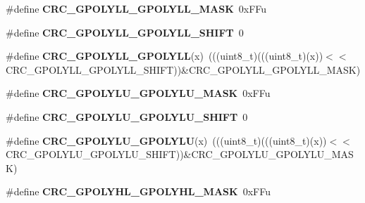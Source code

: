 \begin{DoxyCompactItemize}
\item 
\#define {\bfseries C\+R\+C\+\_\+\+G\+P\+O\+L\+Y\+L\+L\+\_\+\+G\+P\+O\+L\+Y\+L\+L\+\_\+\+M\+A\+SK}~0x\+F\+Fu\hypertarget{group__CRC__Register__Masks_ga659c987f1e9d74e32d16e4b69bd763ee}{}\label{group__CRC__Register__Masks_ga659c987f1e9d74e32d16e4b69bd763ee}

\item 
\#define {\bfseries C\+R\+C\+\_\+\+G\+P\+O\+L\+Y\+L\+L\+\_\+\+G\+P\+O\+L\+Y\+L\+L\+\_\+\+S\+H\+I\+FT}~0\hypertarget{group__CRC__Register__Masks_ga1a323693acd9a37bb90abdc7f16ebbd8}{}\label{group__CRC__Register__Masks_ga1a323693acd9a37bb90abdc7f16ebbd8}

\item 
\#define {\bfseries C\+R\+C\+\_\+\+G\+P\+O\+L\+Y\+L\+L\+\_\+\+G\+P\+O\+L\+Y\+LL}(x)~(((uint8\+\_\+t)(((uint8\+\_\+t)(x))$<$$<$C\+R\+C\+\_\+\+G\+P\+O\+L\+Y\+L\+L\+\_\+\+G\+P\+O\+L\+Y\+L\+L\+\_\+\+S\+H\+I\+FT))\&C\+R\+C\+\_\+\+G\+P\+O\+L\+Y\+L\+L\+\_\+\+G\+P\+O\+L\+Y\+L\+L\+\_\+\+M\+A\+SK)\hypertarget{group__CRC__Register__Masks_gafd454535299300522b0dfe8b5c46b4c4}{}\label{group__CRC__Register__Masks_gafd454535299300522b0dfe8b5c46b4c4}

\item 
\#define {\bfseries C\+R\+C\+\_\+\+G\+P\+O\+L\+Y\+L\+U\+\_\+\+G\+P\+O\+L\+Y\+L\+U\+\_\+\+M\+A\+SK}~0x\+F\+Fu\hypertarget{group__CRC__Register__Masks_gaf2e9b900f7d964512e1541299729abb9}{}\label{group__CRC__Register__Masks_gaf2e9b900f7d964512e1541299729abb9}

\item 
\#define {\bfseries C\+R\+C\+\_\+\+G\+P\+O\+L\+Y\+L\+U\+\_\+\+G\+P\+O\+L\+Y\+L\+U\+\_\+\+S\+H\+I\+FT}~0\hypertarget{group__CRC__Register__Masks_ga4d6303422fb112dfad558ee2f84aa92c}{}\label{group__CRC__Register__Masks_ga4d6303422fb112dfad558ee2f84aa92c}

\item 
\#define {\bfseries C\+R\+C\+\_\+\+G\+P\+O\+L\+Y\+L\+U\+\_\+\+G\+P\+O\+L\+Y\+LU}(x)~(((uint8\+\_\+t)(((uint8\+\_\+t)(x))$<$$<$C\+R\+C\+\_\+\+G\+P\+O\+L\+Y\+L\+U\+\_\+\+G\+P\+O\+L\+Y\+L\+U\+\_\+\+S\+H\+I\+FT))\&C\+R\+C\+\_\+\+G\+P\+O\+L\+Y\+L\+U\+\_\+\+G\+P\+O\+L\+Y\+L\+U\+\_\+\+M\+A\+SK)\hypertarget{group__CRC__Register__Masks_ga0e683f5350c138559c8f6c72771610f9}{}\label{group__CRC__Register__Masks_ga0e683f5350c138559c8f6c72771610f9}

\item 
\#define {\bfseries C\+R\+C\+\_\+\+G\+P\+O\+L\+Y\+H\+L\+\_\+\+G\+P\+O\+L\+Y\+H\+L\+\_\+\+M\+A\+SK}~0x\+F\+Fu\hypertarget{group__CRC__Register__Masks_ga92b941ef781b6023d61bc2af7f0b1818}{}\label{group__CRC__Register__Masks_ga92b941ef781b6023d61bc2af7f0b1818}


\end{DoxyCompactItemize}
